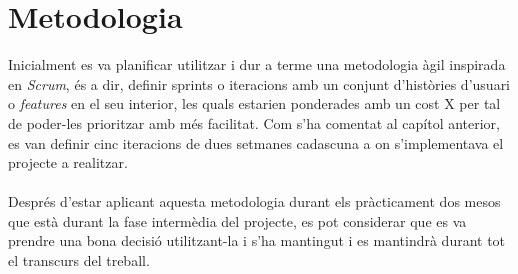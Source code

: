 
\chapter{Metodologia} %

\label{Chapter4} %

Inicialment es va planificar utilitzar i dur a terme una metodologia àgil inspirada en \textit{Scrum}, és a dir, definir sprints o iteracions amb un conjunt d'històries d'usuari o \textit{features} en el seu interior, les quals estarien ponderades amb un cost X per tal de poder-les prioritzar amb més facilitat. Com s'ha comentat al capítol anterior, es van definir cinc iteracions de dues setmanes cadascuna a on s'implementava el projecte a realitzar.
\\\\
Després d'estar aplicant aquesta metodologia durant els pràcticament dos mesos que està durant la fase intermèdia del projecte, es pot considerar que es va prendre una bona decisió utilitzant-la i s'ha mantingut i es mantindrà durant tot el transcurs del treball.